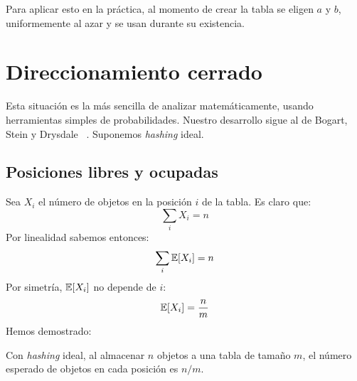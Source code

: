   Para aplicar esto en la práctica,
  al momento de crear la tabla se eligen \(a\) y \(b\),
  uniformemente al azar y se usan durante su existencia.

%
%
%

\section{Direccionamiento cerrado}
\label{sec:hashing-cerrado}

  Esta situación es la más sencilla de analizar matemáticamente,
  usando herramientas simples de probabilidades.
  Nuestro desarrollo sigue al de Bogart, Stein y Drysdale~%
    \cite{bogart10:_discr_math_comp_sci}.
  Suponemos \emph{\foreignlanguage{english}{hashing}} ideal.

\subsection{Posiciones libres y ocupadas}
\label{sec:posiciones-libres-ocupadas}

  Sea \(X_i\) el número de objetos en la posición \(i\) de la tabla.
  Es claro que:
  \begin{equation*}
    \sum_i X_i
      = n
  \end{equation*}
  Por linealidad sabemos entonces:
  \begin{equation*}
    \sum_i \operatorname{\mathbb{E}}[ X_i ]
      = n
  \end{equation*}
  Por simetría,
  \(\operatorname{\mathbb{E}}[ X_i ]\) no depende de \(i\):
  \begin{equation*}
    \operatorname{\mathbb{E}}[ X_i ]
      = \frac{n}{m}
  \end{equation*}
  Hemos demostrado:
  \begin{theorem}
    \label{theo:hash-expected}
    Con \emph{\foreignlanguage{english}{hashing}} ideal,
    al almacenar \(n\) objetos a una tabla de tamaño \(m\),
    el número esperado de objetos en cada posición es \(n/m\).
  \end{theorem}

